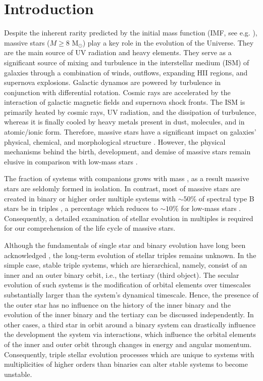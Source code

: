 \section{Introduction}


Despite the inherent rarity predicted by the initial mass function (IMF, see e.g. \cite{chabrier2005initial, dib2018emergence}), massive stars ($M \geq 8$ M$_{\odot}$) play a key role in the evolution of the Universe. They are the main source of UV radiation and heavy elements. They serve as a significant source of mixing and turbulence in the interstellar medium (ISM) of galaxies through a combination of winds, outflows, expanding HII regions, and supernova explosions. Galactic dynamos are powered by turbulence in conjunction with differential rotation. Cosmic rays are accelerated by the interaction of galactic magnetic fields and supernova shock fronts. The ISM is primarily heated by cosmic rays, UV radiation, and the dissipation of turbulence, whereas it is finally cooled by heavy metals present in dust, molecules, and in atomic/ionic form. Therefore, massive stars have a significant impact on galaxies' physical, chemical, and morphological structure \citep{kennicutt2005role}. However, the physical mechanisms behind the birth, development, and demise of massive stars remain elusive in comparison with low-mass stars \citep{zinnecker2007toward}. 


The fraction of systems with companions grows with mass \citep{moe2017mind}, as a result massive stars are seldomly formed in isolation. In contrast, most of massive stars are created in binary or higher order multiple systems with $\sim 50\%$ of spectral type B stars be in triples \citep{sana2014southern,moe2017mind}, a percentage which reduces to $\sim 10\%$ for low-mass stars \citep{raghavan2010survey,toonen2014popcorn,moe2017mind}. Consequently, a detailed examination of stellar evolution in multiples is required for our comprehension of the life cycle of massive stars.


Although the fundamentals of single star and binary evolution have long been acknowledged \citep{postnov2014evolution,toonen2014popcorn}, the long-term evolution of stellar triples remains unknown. In the simple case, stable triple systems, which are hierarchical, namely, consist of an inner and an outer binary orbit, i.e., the tertiary (third object). The secular evolution of such systems is the modification of orbital elements over timescales substantially larger than the system's dynamical timescale. Hence, the presence of the outer star has no influence on the history of the inner binary and the evolution of the inner binary and the tertiary can be discussed independently. In other cases, a third star in orbit around a binary system can drastically influence the development the system via interactions, which influence the orbital elements of the inner and outer orbit through changes in energy and angular momentum. Consequently, triple stellar evolution processes which are unique to systems with multiplicities of higher orders than binaries can alter stable systems to become unstable.


